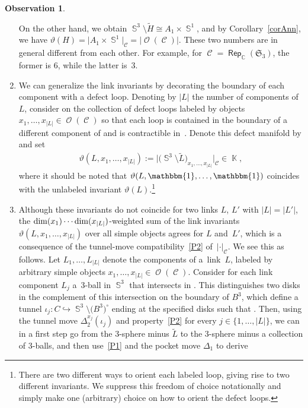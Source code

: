 \documentclass[10pt,a4paper]{amsart}
\DeclareMathOperator{\Rep}{\mathsf{Rep}}
\DeclareMathOperator{\K}{\mathbb{K}}
\DeclareMathOperator{\C}{\mathbb{C}}
\DeclareMathOperator{\Sp}{\mathbb{S}}
\DeclareMathOperator{\calc}{\mathcal{C}}
\DeclareMathOperator{\calo}{\mathcal{O}}
\numberwithin{equation}{section}
\theoremstyle{definition}
\newtheorem{Observation}[Observation]{Observation}
\begin{document}
\begin{Observation}
\begin{enumerate}
 On the other hand, we obtain $\Sp^3\setminus \widetilde{H} \cong A_1 \times \Sp^1$, and by Corollary~\ref{corAnn}, we have $\vartheta(H) = \bigl|A_1 \times \Sp^1\bigr|_{\calc} = |\calo(\calc)|$. These two numbers are in general different from each other. For example, for $\calc = \Rep_{\C}(\mathfrak{S}_3)$, the former is 6, while the latter is~3.
 \item We can generalize the link invariants by decorating the boundary of each component with a defect loop. Denoting by $|L|$ the number of components of~$L$, consider on \smash{$\partial\bigl(\Sp^3 \setminus \widetilde{L}\bigr)$} the collection of defect loops labeled by objects $x_1, \dots, x_{|L|} \in \calo(\calc)$ so that each loop is contained in the boundary of a different component of  and is contractible in~. Denote this defect manifold by \smash{$\bigl(\Sp^3 \setminus \widetilde{L}\bigr)_{x_1, \dots, x_{|L|}}$} and set
 \begin{align*}
 \vartheta(L, x_1, \dots, x_{|L|}) :=\bigl|\bigl(\Sp^3 \setminus \widetilde{L}\bigr)_{x_1, \dots, x_{|L|}}\bigr|_{\calc} \in \K,
 \end{align*}
 where it should be noted that $\vartheta(L, \mathbbm{1}, \dots, \mathbbm{1})$ coincides with the unlabeled invariant $\vartheta(L)$.\footnote{There are two different ways to orient each labeled loop, giving rise to two different invariants. We suppress this freedom of choice notationally and simply make one (arbitrary) choice on how to orient the defect loops.}
 \item Although these invariants do not coincide for two links $L$, $L'$ with $|L| = |L'|$, the $\dim(x_1) \cdots \linebreak \dim(x_{|L|})$-weighted sum of the link invariants $\vartheta(L, x_1, \dots, x_{|L|})$ over all simple objects agrees for $L$ and~$L'$, which is a consequence of the tunnel-move compatibility~\ref{P2} of~$| \cdot|_{\calc}$. We see this as follows. Let $L_1, \dots, L_{|L|}$ denote the components of a~link~$L$, labeled by arbitrary simple objects $x_1, \dots, x_{|L|} \in \calo(\calc)$. Consider for each link component $L_j$ a~3\nobreakdash-ball  in $\Sp^3$ that intersects  in \smash{$B^3 \cap \partial\widetilde{L_j} \cong \Sp^1 \times I$}. This distinguishes two disks in the complement of this intersection on the boundary of $B^3$, which define a tunnel $\iota_j\colon C \hookrightarrow \Sp^3 \setminus \bigl(B^3\bigr)^{\circ}$ ending at the specified disks such that . Then, using the tunnel move $\Delta_2^{x_j}(\iota_j)$ and property~\ref{P2} for every $j \in \{1, \dots, |L|\}$, we can in a first step go from the 3-sphere minus $\widetilde{L}$ to the 3-sphere minus a collection of 3-balls, and then use~\ref{P1} and the pocket move $\Delta_1$ to derive

\end{enumerate}
\end{Observation}
\end{document}
